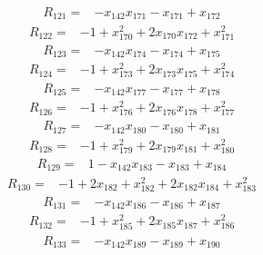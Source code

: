 \[
\begin{aligned}
R_{121}={}&-x_{142}x_{171}-x_{171}+x_{172}
\end{aligned}
\]
\[
\begin{aligned}
R_{122}={}&-1+x_{170}^{2}+2x_{170}x_{172}+x_{171}^{2}
\end{aligned}
\]
\[
\begin{aligned}
R_{123}={}&-x_{142}x_{174}-x_{174}+x_{175}
\end{aligned}
\]
\[
\begin{aligned}
R_{124}={}&-1+x_{173}^{2}+2x_{173}x_{175}+x_{174}^{2}
\end{aligned}
\]
\[
\begin{aligned}
R_{125}={}&-x_{142}x_{177}-x_{177}+x_{178}
\end{aligned}
\]
\[
\begin{aligned}
R_{126}={}&-1+x_{176}^{2}+2x_{176}x_{178}+x_{177}^{2}
\end{aligned}
\]
\[
\begin{aligned}
R_{127}={}&-x_{142}x_{180}-x_{180}+x_{181}
\end{aligned}
\]
\[
\begin{aligned}
R_{128}={}&-1+x_{179}^{2}+2x_{179}x_{181}+x_{180}^{2}
\end{aligned}
\]
\[
\begin{aligned}
R_{129}={}&1-x_{142}x_{183}-x_{183}+x_{184}
\end{aligned}
\]
\[
\begin{aligned}
R_{130}={}&-1+2x_{182}+x_{182}^{2}+2x_{182}x_{184}+x_{183}^{2}
\end{aligned}
\]
\[
\begin{aligned}
R_{131}={}&-x_{142}x_{186}-x_{186}+x_{187}
\end{aligned}
\]
\[
\begin{aligned}
R_{132}={}&-1+x_{185}^{2}+2x_{185}x_{187}+x_{186}^{2}
\end{aligned}
\]
\[
\begin{aligned}
R_{133}={}&-x_{142}x_{189}-x_{189}+x_{190}
\end{aligned}
\]

